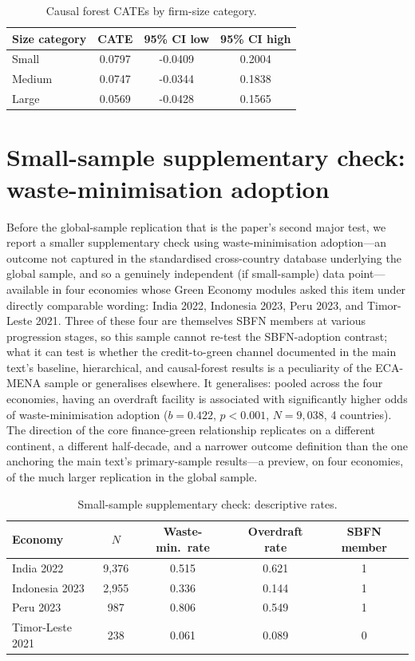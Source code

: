 \documentclass[12pt]{article}
\begin{document}
\begin{table}[htbp]
\centering
\caption{Causal forest CATEs by firm-size category.}
\label{tab:s-sizecate}
\begin{tabular}{lccc}
\toprule
Size category & CATE & 95\% CI low & 95\% CI high \\
\midrule
Small & 0.0797 & -0.0409 & 0.2004 \\
Medium & 0.0747 & -0.0344 & 0.1838 \\
Large & 0.0569 & -0.0428 & 0.1565 \\
\bottomrule
\end{tabular}
\end{table}

\section{Small-sample supplementary check: waste-minimisation adoption}
\label{sec:s-extension}

Before the global-sample replication that is the paper's second major test, we report a smaller
supplementary check using waste-minimisation adoption---an outcome not captured in the standardised
cross-country database underlying the global sample, and so a genuinely independent (if
small-sample) data point---available in four economies whose Green Economy modules asked this item
under directly comparable wording: India 2022, Indonesia 2023, Peru 2023, and Timor-Leste 2021.
Three of these four are themselves SBFN members at various progression stages, so this sample
cannot re-test the SBFN-adoption contrast; what it can test is whether the credit-to-green channel
documented in the main text's baseline, hierarchical, and causal-forest results is a peculiarity of
the ECA-MENA sample or generalises elsewhere. It generalises: pooled across the four economies,
having an overdraft facility is associated with significantly higher odds of waste-minimisation
adoption ($b=0.422$, $p<0.001$, $N=9{,}038$, 4 countries). The direction of the core finance-green
relationship replicates on a different continent, a different half-decade, and a narrower outcome
definition than the one anchoring the main text's primary-sample results---a preview, on four
economies, of the much larger replication in the global sample.

\begin{table}[htbp]
\centering
\caption{Small-sample supplementary check: descriptive rates.}
\label{tab:s-extension}
\begin{footnotesize}
\begin{tabular}{lcccc}
\toprule
Economy & $N$ & Waste-min.\ rate & Overdraft rate & SBFN member \\
\midrule
India 2022 & 9{,}376 & 0.515 & 0.621 & 1 \\
Indonesia 2023 & 2{,}955 & 0.336 & 0.144 & 1 \\
Peru 2023 & 987 & 0.806 & 0.549 & 1 \\
Timor-Leste 2021 & 238 & 0.061 & 0.089 & 0 \\
\bottomrule
\end{tabular}
\end{footnotesize}
\end{table}
\end{document}
